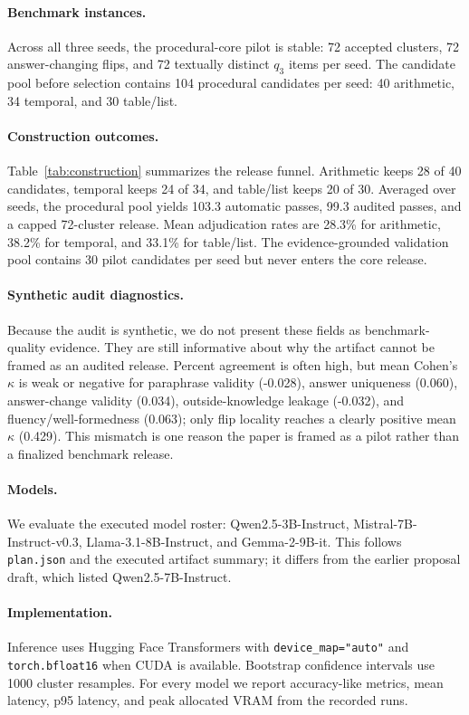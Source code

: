 \documentclass{article}
\begin{document}
\paragraph{Benchmark instances.}
Across all three seeds, the procedural-core pilot is stable: 72 accepted clusters, 72 answer-changing flips, and 72 textually distinct $q_3$ items per seed. The candidate pool before selection contains 104 procedural candidates per seed: 40 arithmetic, 34 temporal, and 30 table/list.

\paragraph{Construction outcomes.}
Table~\ref{tab:construction} summarizes the release funnel. Arithmetic keeps 28 of 40 candidates, temporal keeps 24 of 34, and table/list keeps 20 of 30. Averaged over seeds, the procedural pool yields 103.3 automatic passes, 99.3 audited passes, and a capped 72-cluster release. Mean adjudication rates are 28.3\% for arithmetic, 38.2\% for temporal, and 33.1\% for table/list. The evidence-grounded validation pool contains 30 pilot candidates per seed but never enters the core release.

\paragraph{Synthetic audit diagnostics.}
Because the audit is synthetic, we do not present these fields as benchmark-quality evidence. They are still informative about why the artifact cannot be framed as an audited release. Percent agreement is often high, but mean Cohen's $\kappa$ is weak or negative for paraphrase validity (-0.028), answer uniqueness (0.060), answer-change validity (0.034), outside-knowledge leakage (-0.032), and fluency/well-formedness (0.063); only flip locality reaches a clearly positive mean $\kappa$ (0.429). This mismatch is one reason the paper is framed as a pilot rather than a finalized benchmark release.

\paragraph{Models.}
We evaluate the executed model roster: Qwen2.5-3B-Instruct, Mistral-7B-Instruct-v0.3, Llama-3.1-8B-Instruct, and Gemma-2-9B-it. This follows \texttt{plan.json} and the executed artifact summary; it differs from the earlier proposal draft, which listed Qwen2.5-7B-Instruct.

\paragraph{Implementation.}
Inference uses Hugging Face Transformers with \texttt{device\_map="auto"} and \texttt{torch.bfloat16} when CUDA is available. Bootstrap confidence intervals use 1000 cluster resamples. For every model we report accuracy-like metrics, mean latency, p95 latency, and peak allocated VRAM from the recorded runs.
\end{document}
